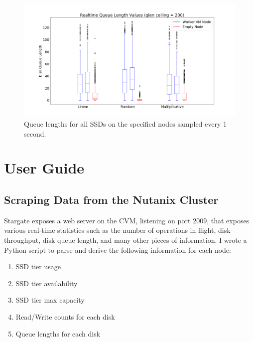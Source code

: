 \documentclass[12pt]{article}
\begin{document}
  \begin{figure}[!htb]
    \centering
    \includegraphics[scale=0.32]{images/qlen_200_box.png} 
    \caption{Queue lengths for all SSDs on the specified nodes sampled every 1
             second.}
    \label{fig:qlen_200}
  \end{figure}

\newpage
\FloatBarrier
\section{User Guide}

  \subsection{Scraping Data from the Nutanix Cluster}

  Stargate exposes a web server on the CVM, listening on port 2009, that
  exposes various real-time statistics such as the number of operations in flight,
  disk throughput, disk queue length, and many other pieces of information. I
  wrote a Python script to parse and derive the following information for each
  node:

  \begin{tcolorbox}
  \begin{enumerate}
    \item SSD tier usage
    \item SSD tier availability
    \item SSD tier max capacity
    \item Read/Write counts for each disk
    \item Queue lengths for each disk
  \end{enumerate}
  \end{tcolorbox}
\end{document}
